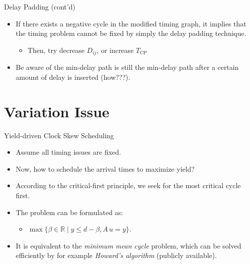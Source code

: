 \documentclass[10pt,ignorenonframetext,mathserif]{beamer}
\providecommand{\tightlist}{%
  \setlength{\itemsep}{0pt}\setlength{\parskip}{0pt}}
\begin{document}
\begin{frame}{Delay Padding (cont'd)}

\begin{itemize}
\tightlist
\item
  If there exists a negative cycle in the modified timing graph, it
  implies that the timing problem cannot be fixed by simply the delay
  padding technique.

  \begin{itemize}
  \tightlist
  \item
    Then, try decrease \(D_{ij}\), or increase \(T_\text{CP}\)
  \end{itemize}
\item
  Be aware of the min-delay path is still the min-delay path after a
  certain amount of delay is inserted (how???).
\end{itemize}

\end{frame}

\section{Variation Issue}\label{variation-issue}

\begin{frame}{Yield-driven Clock Skew Scheduling}

\begin{itemize}
\tightlist
\item
  Assume all timing issues are fixed.
\item
  Now, how to schedule the arrival times to maximize yield?
\item
  According to the critical-first principle, we seek for the most
  critical cycle first.
\item
  The problem can be formulated as:

  \begin{itemize}
  \tightlist
  \item
    \(\max\{\beta \in \mathbb{R} \mid y \leq d - \beta, A\,u = y\}\).
  \end{itemize}
\item
  It is equivalent to the \emph{minimum mean cycle} problem, which can
  be solved efficiently by for example \emph{Howard's algorithm}
  (publicly available).
\end{itemize}

\end{frame}
\end{document}
